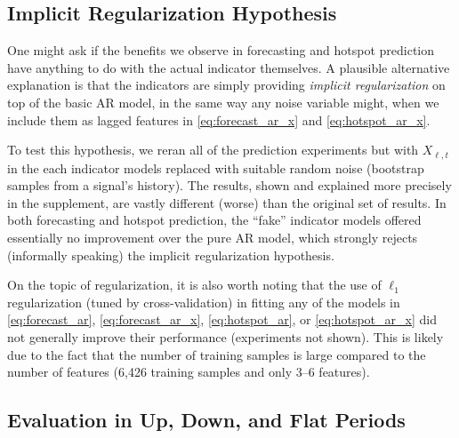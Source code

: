 \documentclass[9pt,twocolumn,twoside,lineno]{pnas-new}
\begin{document}
\subsection{Implicit Regularization Hypothesis}

One might ask if the benefits we observe in forecasting and hotspot
prediction have anything to do with the actual indicator themselves. A plausible  
alternative explanation is that the indicators are simply providing \textit{implicit
  regularization} on top of the basic AR model, in the same way any noise
variable might, when we include them as lagged features in
\eqref{eq:forecast_ar_x} and \eqref{eq:hotspot_ar_x}. 

To test this hypothesis, we reran all of the prediction experiments but with
$X_{\ell,t}$ in the each indicator models replaced with suitable random noise
(bootstrap samples from a signal's history).  The results, shown and explained
more precisely in the supplement, are vastly different (worse) than the original
set of results.  In both forecasting and hotspot prediction, the ``fake''
indicator models offered essentially no improvement over the pure AR model,
which strongly rejects (informally speaking) the implicit regularization
hypothesis.        

On the topic of regularization, it is also worth noting that the use of 
$\ell_1$ regularization (tuned by cross-validation) in fitting any of the models
in \eqref{eq:forecast_ar}, \eqref{eq:forecast_ar_x}, \eqref{eq:hotspot_ar}, or 
\eqref{eq:hotspot_ar_x} did not generally improve their performance
(experiments not shown).  This is likely due to the fact that the number of
training samples is large compared to the number of features (6,426 training
samples and only 3--6 features). 

\subsection{Evaluation in Up, Down, and Flat Periods}
\end{document}
